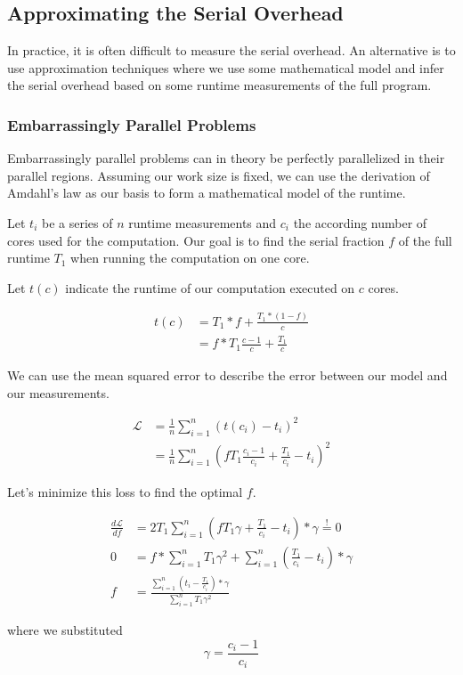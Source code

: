 \subsection{Approximating the Serial Overhead}

In practice, it is often difficult to measure the serial overhead.
An alternative is to use approximation techniques where we use some mathematical model and infer the serial overhead based on some runtime measurements of the full program.

\subsubsection{Embarrassingly Parallel Problems}

Embarrassingly parallel problems can in theory be perfectly parallelized in their parallel regions. Assuming our work size is fixed, we can use the derivation of Amdahl's law as our basis to form a mathematical model of the runtime.

Let $t_i$ be a series of $n$ runtime measurements and $c_i$ the according number of cores used for the computation.
Our goal is to find the serial fraction $f$ of the full runtime $T_1$ when running the computation on one core.

Let $t(c)$ indicate the runtime of our computation executed on $c$ cores.

\begin{align*}
    t(c) &= T_1 * f + \frac{T_1*(1-f)}{c}\\
    &= f * T_1 \frac{c-1}{c} + \frac{T_1}{c}
\end{align*}

We can use the mean squared error to describe the error between our model and our measurements.

\begin{align*}
    \mathcal{L} &= \frac{1}{n} \sum_{i=1}^n \left(t(c_i) - t_i\right)^2\\
    &= \frac{1}{n} \sum_{i=1}^n \left(f T_1 \frac{c_i-1}{c_i} + \frac{T_1}{c_i} - t_i\right)^2
\end{align*}

Let's minimize this loss to find the optimal $f$.

\begin{align*}
    \frac{d \mathcal{L}}{d f} &= 2T_1 \sum_{i=1}^n \left(f T_1 \gamma + \frac{T_1}{c_i} - t_i\right) * \gamma \overset{!}{=} 0\\
    0 &= f * \sum_{i=1}^n T_1 \gamma^2 + \sum_{i=1}^n \left(\frac{T_1}{c_i} - t_i\right) * \gamma\\
    f &= \frac{\sum_{i=1}^n \left(t_i - \frac{T_1}{c_i}\right) * \gamma}{\sum_{i=1}^n T_1 \gamma^2}
\end{align*}

where we substituted
\begin{equation*}
    \gamma = \frac{c_i-1}{c_i}
\end{equation*}